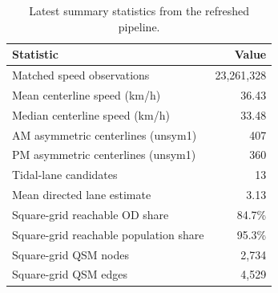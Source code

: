 \begin{table}[htbp]
\centering
\caption{Latest summary statistics from the refreshed pipeline.}
\label{tab:summary}
\begin{tabular}{lr}
\toprule
Statistic & Value \\
\midrule
Matched speed observations & 23,261,328 \\
Mean centerline speed (km/h) & 36.43 \\
Median centerline speed (km/h) & 33.48 \\
AM asymmetric centerlines (unsym1) & 407 \\
PM asymmetric centerlines (unsym1) & 360 \\
Tidal-lane candidates & 13 \\
Mean directed lane estimate & 3.13 \\
Square-grid reachable OD share & 84.7\% \\
Square-grid reachable population share & 95.3\% \\
Square-grid QSM nodes & 2,734 \\
Square-grid QSM edges & 4,529 \\
\bottomrule
\end{tabular}
\end{table}
